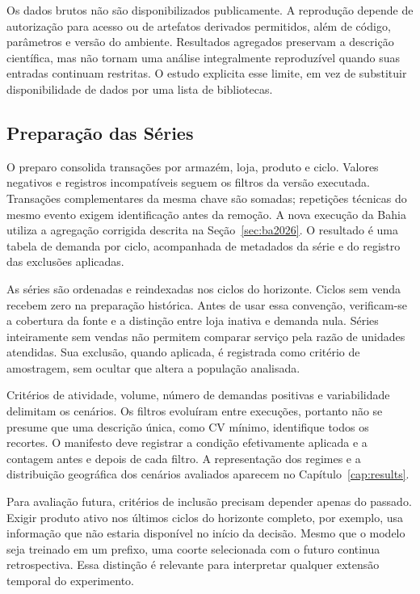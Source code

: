 Os dados brutos não são disponibilizados publicamente. A reprodução depende de autorização para acesso ou de artefatos derivados permitidos, além de código, parâmetros e versão do ambiente. Resultados agregados preservam a descrição científica, mas não tornam uma análise integralmente reproduzível quando suas entradas continuam restritas. O estudo explicita esse limite, em vez de substituir disponibilidade de dados por uma lista de bibliotecas.

\subsection{Preparação das Séries}
\label{sec:pipeline_experimental}

O preparo consolida transações por armazém, loja, produto e ciclo. Valores negativos e registros incompatíveis seguem os filtros da versão executada. Transações complementares da mesma chave são somadas; repetições técnicas do mesmo evento exigem identificação antes da remoção. A nova execução da Bahia utiliza a agregação corrigida descrita na Seção~\ref{sec:ba2026}. O resultado é uma tabela de demanda por ciclo, acompanhada de metadados da série e do registro das exclusões aplicadas.

As séries são ordenadas e reindexadas nos ciclos do horizonte. Ciclos sem venda recebem zero na preparação histórica. Antes de usar essa convenção, verificam-se a cobertura da fonte e a distinção entre loja inativa e demanda nula. Séries inteiramente sem vendas não permitem comparar serviço pela razão de unidades atendidas. Sua exclusão, quando aplicada, é registrada como critério de amostragem, sem ocultar que altera a população analisada.

Critérios de atividade, volume, número de demandas positivas e variabilidade delimitam os cenários. Os filtros evoluíram entre execuções, portanto não se presume que uma descrição única, como CV mínimo, identifique todos os recortes. O manifesto deve registrar a condição efetivamente aplicada e a contagem antes e depois de cada filtro. A representação dos regimes e a distribuição geográfica dos cenários avaliados aparecem no Capítulo~\ref{cap:results}.

Para avaliação futura, critérios de inclusão precisam depender apenas do passado. Exigir produto ativo nos últimos ciclos do horizonte completo, por exemplo, usa informação que não estaria disponível no início da decisão. Mesmo que o modelo seja treinado em um prefixo, uma coorte selecionada com o futuro continua retrospectiva. Essa distinção é relevante para interpretar qualquer extensão temporal do experimento.

